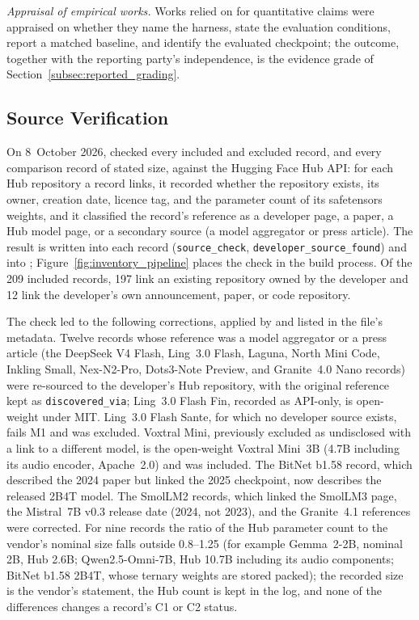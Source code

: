 \emph{Appraisal of empirical works.} Works relied on for quantitative claims were appraised on whether they name the harness, state the evaluation conditions, report a matched baseline, and identify the evaluated checkpoint; the outcome, together with the reporting party's independence, is the evidence grade of Section~\ref{subsec:reported_grading}.

\subsection{Source Verification}
\label{subsec:source_verification}

On 8~October 2026,  checked every included and excluded record, and every comparison record of stated size, against the Hugging Face Hub API: for each Hub repository a record links, it recorded whether the repository exists, its owner, creation date, licence tag, and the parameter count of its safetensors weights, and it classified the record's reference as a developer page, a paper, a Hub model page, or a secondary source (a model aggregator or press article). The result is written into each record (\texttt{source\_check}, \texttt{developer\_source\_found}) and into ; Figure~\ref{fig:inventory_pipeline} places the check in the build process. Of the 209 included records, 197 link an existing repository owned by the developer and 12 link the developer's own announcement, paper, or code repository.

The check led to the following corrections, applied by  and listed in the file's metadata. Twelve records whose reference was a model aggregator or a press article (the DeepSeek V4 Flash, Ling~3.0 Flash, Laguna, North Mini Code, Inkling Small, Nex-N2-Pro, Dots3-Note Preview, and Granite~4.0 Nano records) were re-sourced to the developer's Hub repository, with the original reference kept as \texttt{discovered\_via}; Ling~3.0 Flash Fin, recorded as API-only, is open-weight under MIT. Ling~3.0 Flash Sante, for which no developer source exists, fails M1 and was excluded. Voxtral Mini, previously excluded as undisclosed with a link to a different model, is the open-weight Voxtral Mini~3B (4.7B including its audio encoder, Apache~2.0) and was included. The BitNet b1.58 record, which described the 2024 paper but linked the 2025 checkpoint, now describes the released 2B4T model. The SmolLM2 records, which linked the SmolLM3 page, the Mistral~7B v0.3 release date (2024, not 2023), and the Granite~4.1 references were corrected. For nine records the ratio of the Hub parameter count to the vendor's nominal size falls outside 0.8--1.25 (for example Gemma~2-2B, nominal 2B, Hub 2.6B; Qwen2.5-Omni-7B, Hub 10.7B including its audio components; BitNet b1.58 2B4T, whose ternary weights are stored packed); the recorded size is the vendor's statement, the Hub count is kept in the log, and none of the differences changes a record's C1 or C2 status.

